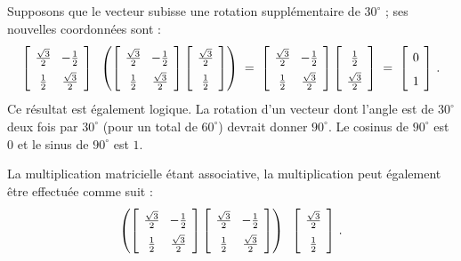 Supposons que le vecteur subisse une rotation supplémentaire de $30^{\circ}$ ; ses nouvelles coordonnées sont :
\begin{equation}\label{eq.rotate1}
\spacearray
\left[\begin{array}{cc}\frac{\sqrt{3}}{2}&-\frac{1}{2}\\\frac{1}{2}&\frac{\sqrt{3}}{2}\end{array}\right]\;\;
\left(\left[\begin{array}{cc}\frac{\sqrt{3}}{2}&-\frac{1}{2}\\\frac{1}{2}&\frac{\sqrt{3}}{2}\end{array}\right]
\left[\begin{array}{c}\frac{\sqrt{3}}{2}\\\frac{1}{2}\end{array}\right]\right)\;=\;
\left[\begin{array}{cc}\frac{\sqrt{3}}{2}&-\frac{1}{2}\\\frac{1}{2}&\frac{\sqrt{3}}{2}\end{array}\right]
\left[\begin{array}{c}\frac{1}{2}\\\frac{\sqrt{3}}{2}\end{array}\right]\;=\;
\left[\begin{array}{c}0\\1\end{array}\right]\,.
\end{equation}
Ce résultat est également logique. La rotation d'un vecteur dont l'angle est de $30^{\circ}$ deux fois par $30^{\circ}$ (pour un total de $60^\circ$) devrait donner $90^{\circ}$. Le cosinus de $90^{\circ}$ est $0$ et le sinus de $90^{\circ}$ est $1$.

La multiplication matricielle étant associative, la multiplication peut également être effectuée comme suit :
\begin{equation}\label{eq.rotate2}
\spacearray
\left(\left[\begin{array}{cc}\frac{\sqrt{3}}{2}&-\frac{1}{2}\\\frac{1}{2}&\frac{\sqrt{3}}{2}\end{array}\right]
\left[\begin{array}{cc}\frac{\sqrt{3}}{2}&-\frac{1}{2}\\\frac{1}{2}&\frac{\sqrt{3}}{2}\end{array}\right]\right)\;\;
\left[\begin{array}{c}\frac{\sqrt{3}}{2}\\\frac{1}{2}\end{array}\right]\,.
\end{equation}

